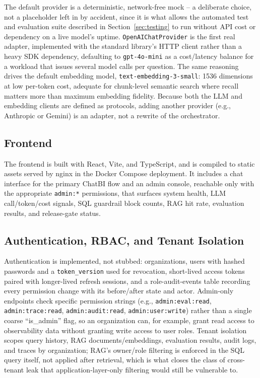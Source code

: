 \documentclass[conference]{IEEEtran}
\begin{document}
The default provider is a deterministic, network-free mock -- a
deliberate choice, not a placeholder left in by accident, since it is what
allows the automated test and evaluation suite described in
Section~\ref{sec:testing} to run without API cost or dependency on a live
model's uptime. \texttt{OpenAIChatProvider} is the first real adapter,
implemented with the standard library's HTTP client rather than a heavy
SDK dependency, defaulting to \texttt{gpt-4o-mini} as a cost/latency
balance for a workload that issues several model calls per question. The
same reasoning drives the default embedding model,
\texttt{text-embedding-3-small}: 1536 dimensions at low per-token cost,
adequate for chunk-level semantic search where recall matters more than
maximum embedding fidelity. Because both the LLM and embedding clients are
defined as protocols, adding another provider (e.g., Anthropic or Gemini)
is an adapter, not a rewrite of the orchestrator.

\subsection{Frontend}

The frontend is built with React, Vite, and TypeScript, and is compiled to
static assets served by nginx in the Docker Compose deployment. It
includes a chat interface for the primary ChatBI flow and an admin console,
reachable only with the appropriate \texttt{admin:*} permissions, that
surfaces system health, LLM call/token/cost signals, SQL guardrail block
counts, RAG hit rate, evaluation results, and release-gate status.

\subsection{Authentication, RBAC, and Tenant Isolation}

Authentication is implemented, not stubbed: organizations, users with
hashed passwords and a \texttt{token\_version} used for revocation,
short-lived access tokens paired with longer-lived refresh sessions, and a
role-audit-events table recording every permission change with its
before/after state and actor. Admin-only endpoints check specific
permission strings (e.g., \texttt{admin:eval:read}, \texttt{admin:trace:read},
\texttt{admin:audit:read}, \texttt{admin:user:write}) rather than a single
coarse ``is\_admin'' flag, so an organization can, for example, grant
read access to observability data without granting write access to user
roles. Tenant isolation scopes query history, RAG documents/embeddings,
evaluation results, audit logs, and traces by organization; RAG's
owner/role filtering is enforced in the SQL query itself, not applied
after retrieval, which is what closes the class of cross-tenant leak that
application-layer-only filtering would still be vulnerable to.
\end{document}

